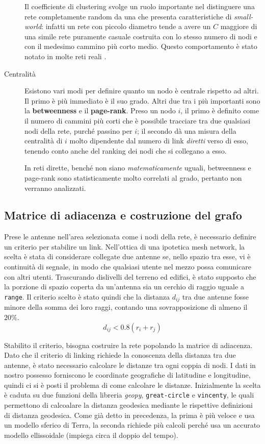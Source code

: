 \begin{description}
	Il coefficiente di clustering svolge un ruolo importante nel distinguere una rete completamente random da una che presenta caratteristiche di \emph{small-world}: infatti un rete con piccolo diametro tende a avere un $C$ maggiore di una simile rete puramente casuale costruita con lo stesso numero di nodi e con il medesimo cammino più corto medio. Questo comportamento è stato notato in molte reti reali \parencite{Watts1998}.
	
	\item[Centralit\`a] Esistono vari modi per definire quanto un nodo è centrale rispetto ad altri. Il primo è più immediato è il suo grado. Altri due tra i più importanti sono la \textbf{betweenness} e il \textbf{page-rank}. Preso un nodo $i$, il primo è definito come il numero di cammini più corti che è possibile tracciare tra due qualsiasi nodi della rete, purché passino per $i$; il secondo dà una misura della centralità di $i$ molto dipendente dal numero di link \emph{diretti} verso di esso, tenendo conto anche del ranking dei nodi che si collegano a esso. 
	
	In reti dirette, benché non siano \emph{matematicamente} uguali, betweenness e page-rank sono statisticamente molto correlati al grado, pertanto non verranno analizzati. 
\end{description}

\subsection{Matrice di adiacenza e costruzione del grafo}
Prese le antenne nell'area selezionata come i nodi della rete, è necessario definire un criterio per stabilire un link. Nell'ottica di una ipotetica mesh network, la scelta è stata di considerare collegate due antenne se, nello spazio tra esse, vi è continuità di segnale, in modo che qualsiasi utente nel mezzo possa comunicare con altri utenti. Trascurando dislivelli del terreno ed edifici, è stato supposto che la porzione di spazio coperta da un'antenna sia un cerchio di raggio uguale a \lstinline{range}. Il criterio scelto è stato quindi che la distanza $d_{ij}$ tra due antenne fosse minore della somma dei loro raggi, contando una sovrapposizione di almeno il $20\%$.
$$d_{ij} < 0.8(r_i+r_j)$$

Stabilito il criterio, bisogna costruire la rete popolando la matrice di adiacenza. Dato che il criterio di linking richiede la conoscenza della distanza tra due antenne, è stato necessario calcolare le distanze tra ogni coppia di nodi. I dati in nostro possesso forniscono le coordinate geografiche di latitudine e longitudine, quindi ci si è posti il problema di come calcolare le distanze. Inizialmente la scelta è caduta su due funzioni della libreria \emph{geopy}, \lstinline{great-circle} e \lstinline{vincenty}, le quali permettono di calcoalare la distanza geodesica mediante le rispettive definizioni di distanza geodesica. Come già detto in precedenza, la prima è più veloce e usa un modello sferico di Terra, la seconda richiede più calcoli perché usa un accurato modello ellissoidale (impiega circa il doppio del tempo).

